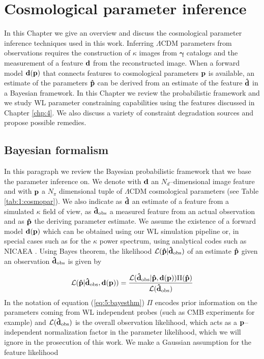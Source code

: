 
\chapter{Cosmological parameter inference}
\lhead[\fancyplain{}{\thepage}]{\fancyplain{}{\rightmark}}
 \thispagestyle{plain}
\setlength{\parindent}{10mm}
\label{chp:5}


In this Chapter we give an overview and discuss the cosmological parameter inference techniques used in this work. Inferring $\Lambda$CDM parameters from observations requires the construction of $\kappa$ images from $\pmb{\gamma}$ catalogs and the measurement of a feature $\mathbf{d}$ from the reconstructed image. When a forward model $\mathbf{d}(\mathbf{p})$ that connects features to cosmological parameters $\mathbf{p}$ is available, an estimate of the parameters $\mathbf{\hat{p}}$ can be derived from an estimate of the feature $\mathbf{\hat{d}}$ in a Bayesian framework. In this Chapter we review the probabilistic framework and we study WL parameter constraining capabilities using the features discussed in Chapter \ref{chp:4}. We also discuss a variety of constraint degradation sources and propose possible remedies.    

\section{Bayesian formalism}
\label{sec:5:bayes}
In this paragraph we review the Bayesian probabilistic framework that we base the parameter inference on. We denote with $\mathbf{d}$ an $N_d$--dimensional image feature and with $\mathbf{p}$ a $N_\pi$ dimensional tuple of $\Lambda$CDM cosmological parameters (see Table \ref{tab:1:cosmopar}). We also indicate as $\mathbf{\hat{d}}$ an estimate of a feature from a simulated $\kappa$ field of view, as $\mathbf{\hat{d}}_{\rm obs}$ a measured feature from an actual observation and as $\mathbf{\hat{p}}$ the deriving parameter estimate. We assume the existence of a forward model $\mathbf{d}(\mathbf{p})$ which can be obtained using our WL simulation pipeline or, in special cases such as for the $\kappa$ power spectrum, using analytical codes such as NICAEA \citep{Nicaea}. Using Bayes theorem, the likelihood $\mathcal{L}(\mathbf{\hat{p}}\vert\mathbf{\hat{d}}_{\rm obs})$ of an estimate $\mathbf{\hat{p}}$ given an observation $\mathbf{\hat{d}}_{\rm obs}$ is given by

\begin{equation}
\label{eq:5:bayesthm}
\mathcal{L}(\mathbf{\hat{p}}\vert\mathbf{\hat{d}}_{\rm obs},\mathbf{d}(\mathbf{p})) = \frac{\mathcal{L}(\mathbf{\hat{d}}_{\rm obs}\vert\mathbf{\hat{p}},\mathbf{d}(\mathbf{p}))\Pi(\mathbf{\hat{p}})}{\mathcal{L}(\mathbf{\hat{d}}_{\rm obs})}
\end{equation}
%
In the notation of equation (\ref{eq:5:bayesthm}) $\Pi$ encodes prior information on the parameters coming from WL independent probes (such as CMB experiments for example) and $\mathcal{L}(\mathbf{\hat{d}}_{\rm obs})$ is the overall observation likelihood, which acts as a $\mathbf{p}$--independent normalization factor in the parameter likelihood, which we will ignore in the prosecution of this work. We make a Gaussian assumption for the feature likelihood 

